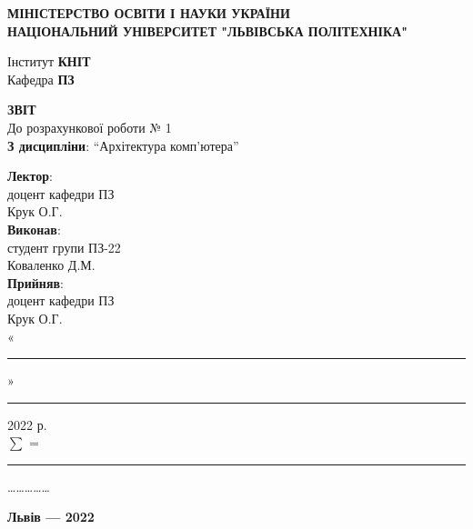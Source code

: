 \documentclass{article}
\newcommand\subject{Архітектура комп'ютера}
\newcommand\lecturer{доцент кафедри ПЗ\\Крук О.Г.}
\newcommand\teacher{доцент кафедри ПЗ\\Крук О.Г.}
\newcommand\mygroup{ПЗ-22}
\newcommand\lab{1}
\begin{document}
\begin{normalsize}
	\begin{titlepage}
		\thispagestyle{empty}
		\begin{center}
			\textbf{МІНІСТЕРСТВО ОСВІТИ І НАУКИ УКРАЇНИ\\
				НАЦІОНАЛЬНИЙ УНІВЕРСИТЕТ "ЛЬВІВСЬКА ПОЛІТЕХНІКА"}
		\end{center}
		\begin{flushright}
			Інститут \textbf{КНІТ}\\
			Кафедра \textbf{ПЗ}
		\end{flushright}
		\vspace{200pt}
		\begin{center}
			\textbf{ЗВІТ}\\
			\vspace{10pt}
			До розрахункової роботи № \lab\\
			\textbf{З дисципліни}: “\subject”
		\end{center}
		\vspace{112pt}
		\begin{flushright}
			
			\textbf{Лектор}:\\
			\lecturer\\
			\vspace{28pt}
			\textbf{Виконав}:\\
			
			студент групи \mygroup\\
			Коваленко Д.М.\\
			\vspace{28pt}
			\textbf{Прийняв}:\\
			
			\teacher\\
			
			\vspace{28pt}
			«\rule{1cm}{0.15mm}» \rule{1.5cm}{0.15mm} 2022 р.\\
			$\sum$ = \rule{1cm}{0.15mm}……………\\
			
		\end{flushright}
		\vspace{\fill}
		\begin{center}
			\textbf{Львів — 2022}
		\end{center}
	\end{titlepage}


\end{normalsize}
\end{document}
